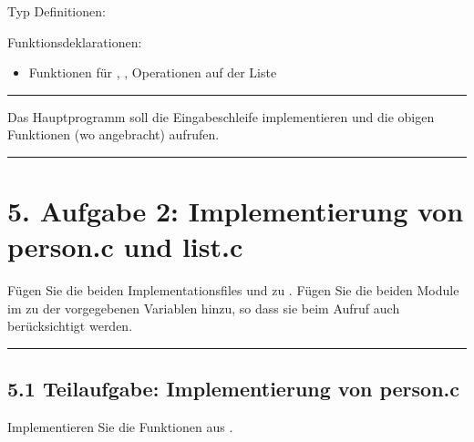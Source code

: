 \documentclass[a4paper,10pt,english]{report}
\begin{document}
\sphinxAtStartPar
{}

\sphinxAtStartPar
Typ Definitionen:

\begin{sphinxVerbatim}[commandchars=\\\{\}]
 
\end{sphinxVerbatim}

\sphinxAtStartPar
Funktionsdeklarationen:
\begin{itemize}
\item {} 
\sphinxAtStartPar
Funktionen für , ,  Operationen auf der Liste

\end{itemize}


\bigskip\hrule\bigskip


\sphinxAtStartPar
Das Hauptprogramm soll die Eingabeschleife implementieren und die obigen Funktionen (wo angebracht) aufrufen.


\bigskip\hrule\bigskip



\section{5. Aufgabe 2: Implementierung von person.c und list.c}
\label{\detokenize{P06_Personen_Verwaltung_Linked_List/README:aufgabe-2-implementierung-von-person-c-und-list-c}}
\sphinxAtStartPar
Fügen Sie die beiden Implementationsfiles  und  zu . Fügen Sie die beiden Module im  zu der vorgegebenen Variablen  hinzu, so dass sie beim  Aufruf auch berücksichtigt werden.


\bigskip\hrule\bigskip



\subsection{5.1	Teilaufgabe: Implementierung von person.c}
\label{\detokenize{P06_Personen_Verwaltung_Linked_List/README:teilaufgabe-implementierung-von-person-c}}
\sphinxAtStartPar
Implementieren Sie die Funktionen aus .
\end{document}
